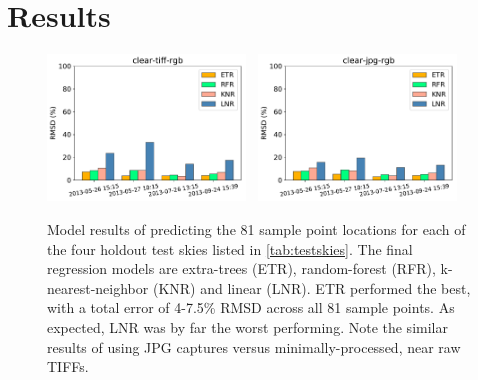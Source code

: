 \section{Results}
\label{sec:results}

\begin{figure}[pos=tbp]
\begin{center}
\includegraphics[width=0.47\textwidth]{img/results_clear-tiff-rgb.pdf}~
\includegraphics[width=0.47\textwidth]{img/results_clear-jpg-rgb.pdf}
\caption[resultsmodels]{Model results of predicting the 81 sample point locations for each of the four holdout test skies listed in \autoref{tab:testskies}. The final regression models are extra-trees (ETR), random-forest (RFR), k-nearest-neighbor (KNR) and linear (LNR). ETR performed the best, with a total error of 4-7.5\% RMSD across all 81 sample points. As expected, LNR was by far the worst performing. Note the similar results of using JPG captures versus minimally-processed, near raw TIFFs.}
\label{fig:results_models}
\end{center}
\end{figure}

